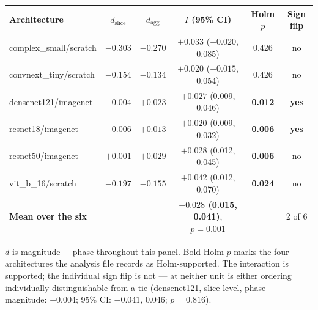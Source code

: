 \documentclass[11pt,a4paper]{article}
\begin{document}
\begin{table}[htbp]
\vspace{0.2em}
\begin{tabular}{lccccc}
\toprule
Architecture & $d_{\text{slice}}$ & $d_{\text{agg}}$ & $I$ (95\% CI) & Holm $p$ & Sign flip\\
\midrule
complex\_small/scratch  & $-0.303$ & $-0.270$ & $+0.033$ ($-0.020$, 0.085) & 0.426 & no\\
convnext\_tiny/scratch  & $-0.154$ & $-0.134$ & $+0.020$ ($-0.015$, 0.054) & 0.426 & no\\
densenet121/imagenet    & $-0.004$ & $+0.023$ & $+0.027$ (0.009, 0.046) & \textbf{0.012} & \textbf{yes}\\
resnet18/imagenet       & $-0.006$ & $+0.013$ & $+0.020$ (0.009, 0.032) & \textbf{0.006} & \textbf{yes}\\
resnet50/imagenet       & $+0.001$ & $+0.029$ & $+0.028$ (0.012, 0.045) & \textbf{0.006} & no\\
vit\_b\_16/scratch      & $-0.197$ & $-0.155$ & $+0.042$ (0.012, 0.070) & \textbf{0.024} & no\\
\midrule
\textbf{Mean over the six} & & & \textbf{$+0.028$ (0.015, 0.041)}, $p=0.001$ & & 2 of 6\\
\bottomrule
\end{tabular}

\vspace{0.3em}
\footnotesize
$d$ is magnitude $-$ phase throughout this panel. Bold Holm $p$ marks the four
architectures the analysis file records as Holm-supported. The interaction is
supported; the individual sign flip is not --- at neither unit is either ordering
individually distinguishable from a tie (densenet121, slice level, phase $-$
magnitude: $+0.004$; 95\% CI: $-0.041$, 0.046; $p=0.816$).
\end{table}
\end{document}
